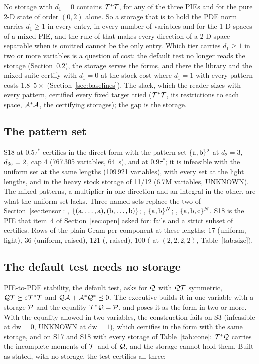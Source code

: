 No storage with $d_1=0$ contains $\mathcal{T}^*\mathcal{T}$, for any of the three PIEs and for the pure 2-D state of order $(0,2)$ alone. So a storage that is to hold the PDE norm carries $d_1\ge1$ in every entry, in every number of variables and for the 1-D spaces of a mixed PIE, and the rule of  that makes every direction of a 2-D space separable when  is omitted cannot be the only entry. Which tier carries $d_1\ge1$ in two or more variables is a question of cost: the default test no longer reads the storage (Section~\ref{sec:mixed-q}), the storage serves the  forms, and there the library and the mixed suite certify with $d_1=0$ at the stock cost where $d_1=1$ with every pattern costs $1.8$--$5\times$ (Section~\ref{sec:baselines}). The slack, which the reader sizes with every pattern, certified every fixed target tried ($\mathcal{T}^*\mathcal{T}$, its restrictions to each space, $\mathcal{A}^*\mathcal{A}$, the certifying storages); the gap is the storage.

\subsection{The pattern set}\label{sec:mixed-patterns}

S18 at $0.5\tau^*$ certifies in the direct form  with the pattern set $\{\mathrm{a},\mathrm{b}\}^2$ at $d_2=3$, $d_{3\mathrm{a}}=2$, cap $4$ (767\,305 variables, 64~s), and at $0.9\tau^*$; it is infeasible with the uniform set at the same lengths (109\,921 variables), with every set at the light lengths, and in the heavy stock storage of 11/12 (6.7M variables, UNKNOWN). The mixed patterns, a multiplier in one direction and an integral in the other, are what the uniform set lacks. Three named sets replace the two of Section~\ref{sec:tensor}: , $\{(\mathrm{a},\dots,\mathrm{a}),(\mathrm{b},\dots,\mathrm{b})\}$; , $\{\mathrm{a},\mathrm{b}\}^N$; , $\{\mathrm{a},\mathrm{b},\mathrm{c}\}^N$. S18 is the PIE that item~4 of Section~\ref{sec:open} asked for:  fails and a strict subset of  certifies. Rows of the plain Gram per component at these lengths: $17$ (uniform, light), $36$ (uniform, raised), $121$ (, raised), $100$ ( at $(2,2,2,2)$, Table~\ref{tab:size}).

\subsection{The default test needs no storage}\label{sec:mixed-q}

PIE-to-PDE stability, the default test, asks for $\mathcal{Q}$ with $\mathcal{Q}\mathcal{T}$ symmetric, $\mathcal{Q}\mathcal{T}\succeq\varepsilon\mathcal{T}^*\mathcal{T}$ and $\mathcal{Q}\mathcal{A}+\mathcal{A}^*\mathcal{Q}^*\preceq0$. The executive builds it in one variable with a storage $\mathcal{P}$ and the equality $\mathcal{T}^*\mathcal{Q}=\mathcal{P}$, and poses it as the  form in two or more. With the equality allowed in two variables, the construction fails on S3 (infeasible at $\mathrm{dw}=0$, UNKNOWN at $\mathrm{dw}=1$), which certifies in the  form with the same storage, and on S17 and S18 with every storage of Table~\ref{tab:cone}: $\mathcal{T}^*\mathcal{Q}$ carries the incomplete moments of $\mathcal{T}$ and of $\mathcal{Q}$, and the storage cannot hold them. Built as stated, with no storage, the test certifies all three:

